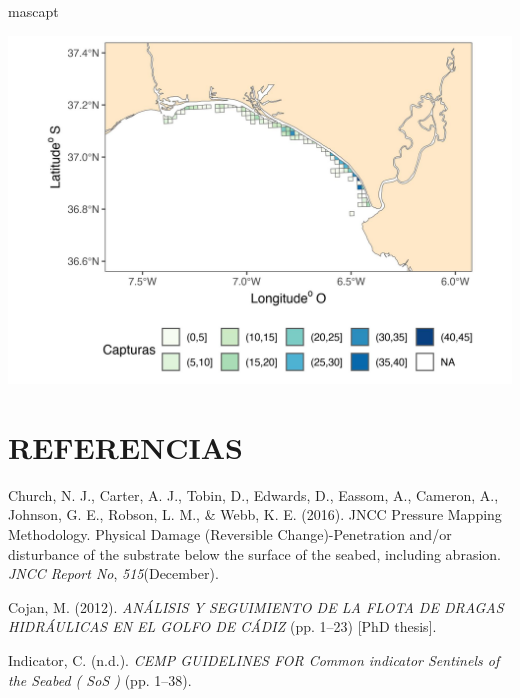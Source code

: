\documentclass[
]{article}
\newenvironment{Shaded}{\begin{snugshade}}{\end{snugshade}}
\newcommand{\NormalTok}[1]{#1}
\newlength{\cslhangindent}
\newlength{\cslentryspacingunit} %
\newenvironment{CSLReferences}[2] %
 {%
  \setlength{\parindent}{0pt}
  \ifodd #1
  \let\oldpar\par
  \def\par{\hangindent=\cslhangindent\oldpar}
  \fi
  \setlength{\parskip}{#2\cslentryspacingunit}
 }%
 {}
\begin{document}
\begin{Shaded}
\begin{Highlighting}[]
\NormalTok{mascapt}
\end{Highlighting}
\end{Shaded}

\begin{center}\includegraphics{SAR_Method_files/figure-latex/unnamed-chunk-30-1} \end{center}

\newpage

\hypertarget{referencias}{%
\section*{REFERENCIAS}\label{referencias}}

\hypertarget{refs}{}
\begin{CSLReferences}{1}{0}
\leavevmode{}%
Church, N. J., Carter, A. J., Tobin, D., Edwards, D., Eassom, A., Cameron, A., Johnson, G. E., Robson, L. M., \& Webb, K. E. (2016). {JNCC Pressure Mapping Methodology. Physical Damage (Reversible Change)-Penetration and/or disturbance of the substrate below the surface of the seabed, including abrasion}. \emph{JNCC Report No}, \emph{515}(December).

\leavevmode{}%
Cojan, M. (2012). \emph{{AN{Á}LISIS Y SEGUIMIENTO DE LA FLOTA DE DRAGAS HIDR{Á}ULICAS EN EL GOLFO DE C{Á}DIZ}} (pp. 1--23) {[}PhD thesis{]}.

\leavevmode{}%
Indicator, C. (n.d.). \emph{{CEMP GUIDELINES FOR Common indicator Sentinels of the Seabed ( SoS )}} (pp. 1--38).

\end{CSLReferences}
\end{document}
